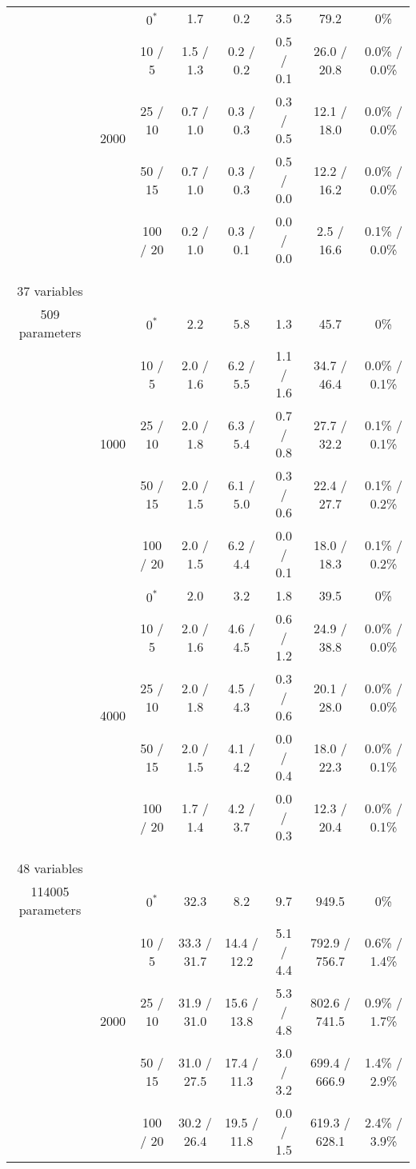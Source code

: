\documentclass[twoside,11pt]{article}
\begin{document}
\begin{table}[ht]
\begin{tabular}{ c | c | c || c | c | c | c | c  }
\hhline{~|-|-||-|-|-|-|-}

& \multirow{5}{*}{2000}

& $0^*$ & 1.7 & 0.2 & 3.5 & 79.2 & 0\% \\
& & 10 / 5 & 1.5 / 1.3 & 0.2 / 0.2 & 0.5 / 0.1 & 26.0 / 20.8 & 0.0\% / 0.0\% \\
& & 25 / 10 & 0.7 / 1.0 & 0.3 / 0.3 & 0.3 / 0.5 & 12.1 / 18.0 & 0.0\% / 0.0\% \\
& & 50 / 15 & 0.7 / 1.0 & 0.3 / 0.3 & 0.5 / 0.0 & 12.2 / 16.2 & 0.0\% / 0.0\% \\
& & 100 / 20 & 0.2 / 1.0 & 0.3 / 0.1 & 0.0 / 0.0 & 2.5 / 16.6 & 0.1\% / 0.0\% \\

\hhline{=|=|=||=|=|=|=|=}
\multirow{10}{*}{\thead{\textbf{alarm} \\ \\ 37 variables \\ 509 parameters}} & \multirow{5}{*}{1000} 
& $0^*$ & 2.2 & 5.8 & 1.3 & 45.7 & 0\% \\
& & 10 / 5 & 2.0 / 1.6 & 6.2 / 5.5 & 1.1 / 1.6 & 34.7 / 46.4 & 0.0\% / 0.1\% \\
& & 25 / 10 & 2.0 / 1.8 & 6.3 / 5.4 & 0.7 / 0.8 & 27.7 / 32.2 & 0.1\% / 0.1\% \\
& & 50 / 15 & 2.0 / 1.5 & 6.1 / 5.0 & 0.3 / 0.6 & 22.4 / 27.7 & 0.1\% / 0.2\% \\
& & 100 / 20 & 2.0 / 1.5 & 6.2 / 4.4 & 0.0 / 0.1 & 18.0 / 18.3 & 0.1\% / 0.2\% \\

\hhline{~|-|-||-|-|-|-|-} 
& \multirow{5}{*}{4000}
& $0^*$ & 2.0 & 3.2 & 1.8 & 39.5 & 0\% \\
& & 10 / 5 & 2.0 / 1.6 & 4.6 / 4.5 & 0.6 / 1.2 & 24.9 / 38.8 & 0.0\% / 0.0\% \\
& & 25 / 10 & 2.0 / 1.8 & 4.5 / 4.3 & 0.3 / 0.6 & 20.1 / 28.0 & 0.0\% / 0.0\% \\
& & 50 / 15 & 2.0 / 1.5 & 4.1 / 4.2 & 0.0 / 0.4 & 18.0 / 22.3 & 0.0\% / 0.1\% \\
& & 100 / 20 & 1.7 / 1.4 & 4.2 / 3.7 & 0.0 / 0.3 & 12.3 / 20.4 & 0.0\% / 0.1\% \\


\hhline{=|=|=||=|=|=|=|=}
\multirow{10}{*}{\thead{\textbf{barley} \\ \\ 48 variables \\ 114005 parameters}} & \multirow{5}{*}{2000} 
& $0^*$ & 32.3 & 8.2 & 9.7 & 949.5 & 0\% \\
& & 10 / 5 & 33.3 / 31.7 & 14.4 / 12.2 & 5.1 / 4.4 & 792.9 / 756.7 & 0.6\% / 1.4\% \\
& & 25 / 10 & 31.9 / 31.0 & 15.6 / 13.8 & 5.3 / 4.8 & 802.6 / 741.5 & 0.9\% / 1.7\% \\
& & 50 / 15 & 31.0 / 27.5 & 17.4 / 11.3 & 3.0 / 3.2 & 699.4 / 666.9 & 1.4\% / 2.9\% \\
& & 100 / 20 & 30.2 / 26.4 & 19.5 / 11.8 & 0.0 / 1.5 & 619.3 / 628.1 & 2.4\% / 3.9\% \\



\end{tabular}
\end{table}
\end{document}
